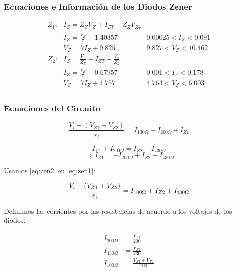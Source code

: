 \documentclass[12pt]{article}
\begin{document}
\subsubsection{Ecuaciones e Información de los Diodos Zener}

\begin{align*}
  Z_1 :& I_Z = Z_Z V_Z + I_{ZT} - Z_Z V_{Z_T}\\
      & I_Z = \frac{V_Z}{7} - 1.40357 & 0.00025 < I_Z < 0.091\\
      & V_Z = 7 I_Z + 9.825 & 9.827 < V_Z < 10.462\\
  Z_2 :& I_Z = \frac{V_Z}{Z_Z} + I_{ZT} - \frac{V_Z}{Z_Z} \\
       & I_Z = \frac{V_Z}{7} - 0.67957 & 0.001 < I_Z < 0.178 \\
       & V_Z = 7 I_Z + 4.757 & 4.764 < V_Z < 6.003\\
\end{align*}

\subsubsection{Ecuaciones del Circuito}

\begin{equation} \label{eq:zen1}
  \frac{V_i - (V_{Z1}+V_{Z2})}{r_i} = I_{100\Omega} + I_{200\Omega} + I_{Z1}
\end{equation}

\begin{equation*}
  I_{Z1} + I_{200\Omega} = I_{Z2} + I_{430\Omega}
\end{equation*}
\begin{equation} \label{eq:zen2}
  \Rightarrow I_{Z1} = -I_{200\Omega} + I_{Z2} + I_{430\Omega}
\end{equation}

Usamos \ref{eq:zen2} en \ref{eq:zen1}:

\begin{equation} \label{eq:zen3}
  \frac{V_i - (V_{Z1}+V_{Z2})}{r_i} = I_{100\Omega} + I_{Z2} + I_{430\Omega}\\
\end{equation}

Definimos las corrientes por las resistencias de acuerdo a los voltajes de los
diodos:

\begin{align}
  I_{200\Omega} &= \frac{V_{Z1}}{200} \label{eq:zen4} \\
  I_{430\Omega} &= \frac{V_{Z2}}{430} \label{eq:zen5} \\
  I_{100\Omega} &= \frac{V_{Z1} + V_{Z2}}{100} \label{eq:zen6}
\end{align}
\end{document}
